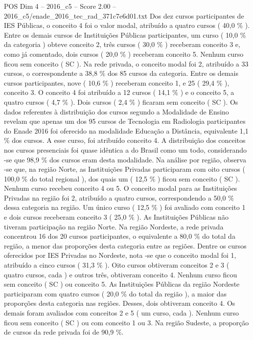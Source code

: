 \begin{textsample}{POS Dim 4 – 2016\_c5 – Score 2.00 – 2016\_c5/enade\_2016\_tec\_rad\_371c7e6d01.txt}
Dos dez cursos participantes de IES Públicas, o conceito 4 foi o valor modal, atribuído a quatro cursos ( 40,0 \% ).
Entre os demais cursos de Instituições Públicas participantes, um curso ( 10,0 \% da categoria ) obteve conceito 2, três cursos ( 30,0 \% ) receberam conceito 3 e, como já comentado, dois cursos ( 20,0 \% ) receberam conceito 5.
Nenhum curso ficou sem conceito ( SC ).
Na rede privada, o conceito modal foi 2, atribuído a 33 cursos, o correspondente a 38,8 \% dos 85 cursos da categoria.
Entre os demais cursos participantes, nove ( 10,6 \% ) receberam conceito 1, e 25 ( 29,4 \% ), conceito 3.
O conceito 4 foi atribuído a 12 cursos ( 14,1 \% ) e o conceito 5, a quatro cursos ( 4,7 \% ).
Dois cursos ( 2,4 \% ) ficaram sem conceito ( SC ).
Os dados referentes à distribuição dos cursos segundo a Modalidade de Ensino revelam que apenas um dos 95 cursos de Tecnologia em Radiologia participantes do Enade 2016 foi oferecido na modalidade Educação a Distância, equivalente 1,1 \% dos cursos.
A esse curso, foi atribuído conceito 4.
A distribuição dos conceitos nos cursos presenciais foi quase idêntica a do Brasil como um todo, considerando -se que 98,9 \% dos cursos eram desta modalidade.
Na análise por região, observa -se que, na região Norte, as Instituições Privadas participaram com oito cursos ( 100,0 \% do total regional ), dos quais um ( 12,5 \% ) ficou sem conceito ( SC ).
Nenhum curso recebeu conceito 4 ou 5.
O conceito modal para as Instituições Privadas na região foi 2, atribuído a quatro cursos, correspondendo a 50,0 \% dessa categoria na região.
Um único curso ( 12,5 \% ) foi avaliado com conceito 1 e dois cursos receberam conceito 3 ( 25,0 \% ).
As Instituições Públicas não tiveram participação na região Norte.
Na região Nordeste, a rede privada concentrou 16 dos 20 cursos participantes, o equivalente a 80,0 \% do total da região, a menor das proporções desta categoria entre as regiões.
Dentre os cursos oferecidos por IES Privadas no Nordeste, nota -se que o conceito modal foi 1, atribuído a cinco cursos ( 31,3 \% ).
Oito cursos obtiveram conceitos 2 e 3 ( quatro cursos, cada ) e outros três, obtiveram conceito 4.
Nenhum curso ficou sem conceito ( SC ) ou conceito 5.
As Instituições Públicas da região Nordeste participaram com quatro cursos ( 20,0 \% do total da região ), a maior das proporções desta categoria nas regiões.
Desses, dois obtiveram conceito 4.
Os demais foram avaliados com conceitos 2 e 5 ( um curso, cada ).
Nenhum curso ficou sem conceito ( SC ) ou com conceito 1 ou 3.
Na região Sudeste, a proporção de cursos da rede privada foi de 90,9 \%.

\end{textsample}

